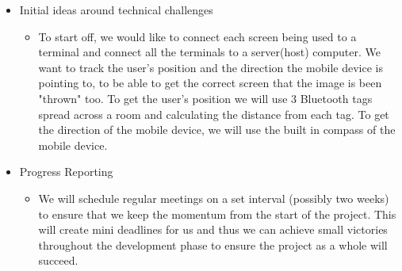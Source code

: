 
\begin{itemize}
	\item Initial ideas around technical challenges
	\begin{itemize}
		\item[] To start off, we would like to connect each screen being used to a terminal and connect all the terminals to a server(host) computer. We want to track the user's position and the direction the mobile device is pointing to, to be able to get the correct screen that the image is been "thrown" too. To get the user's position we will use 3 Bluetooth tags spread across a room and calculating the distance from each tag. To get the direction of the mobile device, we will use the built in compass of the mobile device.
	\end{itemize}
	
	\item Progress Reporting
	\begin{itemize}
		\item[] We will schedule regular meetings on a set interval (possibly two weeks) to ensure that we keep the momentum from the start of the project. This will create mini deadlines for us and thus we can achieve small victories throughout the development phase to ensure the project as a whole will succeed.
	\end{itemize}
	

\end{itemize}
